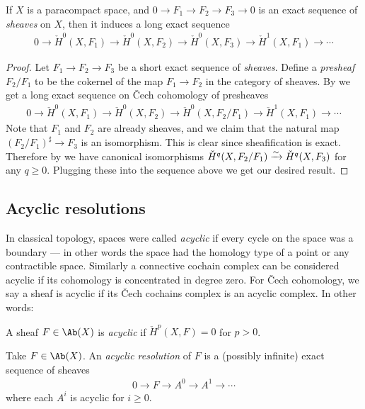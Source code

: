 \documentclass[11pt]{book}
\begin{document}
\begin{proposition}\label{prop:LES-Cech-cohomology}
If $X$ is a paracompact space, and $0 \to F_1 \to F_2 \to F_3 \to 0$ is an exact sequence of \emph{sheaves} on $X$, then it induces a long exact sequence
\begin{align*}
    0 \to \check{H}^0(X,F_1) \to \check{H}^0(X,F_2) \to \check{H}^0(X,F_3) \to \check{H}^1(X,F_1) \to \cdots
\end{align*}
\end{proposition}
\begin{proof} Let $F_1 \to F_2 \to F_3$ be a short exact sequence of \emph{sheaves}. Define a \emph{presheaf} $F_2/F_1$ to be the cokernel of the map $F_1 \to F_2$ in the category of sheaves. By  we get a long exact sequence on \v{C}ech cohomology of presheaves
\begin{align*}
    0 \to \check{H}^0(X,F_1) \to \check{H}^0(X,F_2) \to \check{H}^0(X, F_2/F_1) \to \check{H}^1(X,F_1) \to \cdots 
\end{align*}
Note that $F_1$ and $F_2$ are already sheaves, and we claim that the natural map $(F_2/F_1)^\sharp \to F_3$ is an isomorphism. This is clear since sheafification is exact. Therefore by  we have canonical isomorphisms $\check{H}^q(X,F_2/F_1) \xrightarrow{\sim} \check{H}^q(X,F_3)$ for any $q\ge0$. Plugging these into the sequence above we get our desired result.
\end{proof}

\subsection{Acyclic resolutions}

In classical topology, spaces were called \emph{acyclic} if every cycle on the space was a boundary --- in other words the space had the homology type of a point or any contractible space. Similarly a connective cochain complex can be considered acyclic if its cohomology is concentrated in degree zero. For \v{C}ech cohomology, we say a sheaf is acyclic if its \v{C}ech cochains complex is an acyclic complex. In other words:

\begin{definition}\label{def:acyclic-sheaf} A sheaf $F\in \Ab(X)$ is \emph{acyclic} if $\check{H}^p(X,F) = 0$ for $p>0$.
\end{definition}

\begin{definition} Take $F\in \Ab(X)$. An \emph{acyclic resolution} of $F$ is a (possibly infinite) exact sequence of sheaves
\begin{align*}
    0 \to F \to A^0 \to A^1 \to \cdots
\end{align*}
where each $A^i$ is acyclic for $i\ge 0$.
\end{definition}
\end{document}
